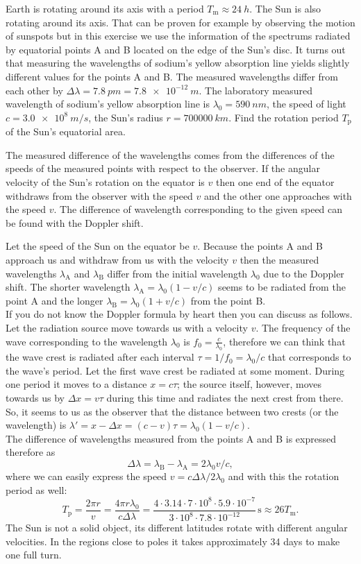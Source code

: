Earth is rotating around its axis with a period $T_\text{m}\approx\SI{24}{h}$. The Sun is also rotating around its axis. That can be proven for example by observing the motion of sunspots but in this exercise we use the information of the spectrums radiated by equatorial points A and B located on the edge of the Sun’s disc. It turns out that measuring the wavelengths of sodium’s yellow absorption line yields slightly different values for the points A and B. The measured wavelengths differ from each other by $\Delta \lambda = \SI{7.8}{pm}=\SI{7.8e-12}{m}$. The laboratory measured wavelength of sodium’s yellow absorption line is $\lambda_0=\SI{590}{nm}$, the speed of light $c=\SI{3.0e8}{m/s}$, the Sun’s radius $r=\SI{700000}{km}$. Find the rotation period $T_\text{p}$ of the Sun’s equatorial area.

\hinteng
The measured difference of the wavelengths comes from the differences of the speeds of the measured points with respect to the observer. If the angular velocity of the Sun’s rotation on the equator is $v$ then one end of the equator withdraws from the observer with the speed $v$ and the other one approaches with the speed $v$. The difference of wavelength corresponding to the given speed can be found with the Doppler shift.

\solueng
Let the speed of the Sun on the equator be $v$. Because the points A and B approach us and withdraw from us with the velocity $v$ then the measured wavelengths $\lambda_\text{A}$ and $\lambda_\text{B}$ differ from the initial wavelength $\lambda_0$ due to the Doppler shift. The shorter wavelength $\lambda_\text{A}=\lambda_0(1-v/c)$ seems to be radiated from the point A and the longer $\lambda_\text{B}=\lambda_0(1+v/c)$ from the point B.\\
If you do not know the Doppler formula by heart then you can discuss as follows. Let the radiation source move towards us with a velocity $v$. The frequency of the wave corresponding to the wavelength $\lambda_0$ is $f_0=\frac{c}{\lambda_0}$, therefore we can think that the wave crest is radiated after each interval $\tau = 1/f_0 = \lambda_0/c$ that corresponds to the wave’s period. Let the first wave crest be radiated at some moment. During one period it moves to a distance $x=c\tau$; the source itself, however, moves towards us by $\Delta x = v\tau$ during this time and radiates the next crest from there. So, it seems to us as the observer that the distance between two crests (or the wavelength) is $\lambda'=x-\Delta x=(c-v)\tau = \lambda_0(1-v/c)$.\\
The difference of wavelengths measured from the points A and B is expressed therefore as
\[
\Delta\lambda = \lambda_\text{B}-\lambda_\text{A} = 2\lambda_0 v/c,
\]
where we can easily express the speed $v=c\Delta\lambda/2\lambda_0$ and with this the rotation period as well:
\[
T_\text{p}=\frac{2\pi r}{v}=\frac{4 \pi r \lambda_0}{c\Delta \lambda}=
\frac{4 \cdot 3.14 \cdot 7\cdot 10^8 \cdot 5.9 \cdot 10^{-7}}{3\cdot 10^8\cdot 7.8\cdot 10^{-12}}\,\text{s}\approx 26T_\mathrm{m}.
\]
The Sun is not a solid object, its different latitudes rotate with different angular velocities. In the regions close to poles it takes approximately 34 days to make one full turn.
\probend